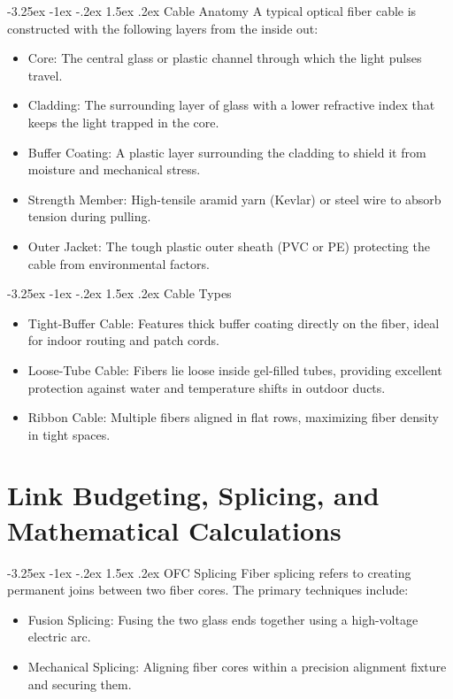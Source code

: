 \documentclass[11pt,a4paper]{report}
\makeatletter
\renewcommand{\section}{\@startsection{section}{1}{\z@}%
  {-3.25ex \@plus -1ex \@minus -.2ex}%
  {1.5ex \@plus.2ex}%
  {\normalfont\Large\bfseries\color{primaryColor}}}
\makeatother
\begin{document}
\section{Cable Anatomy}
A typical optical fiber cable is constructed with the following layers from the inside out:
\begin{itemize}
  \item Core: The central glass or plastic channel through which the light pulses travel.
  \item Cladding: The surrounding layer of glass with a lower refractive index that keeps the light trapped in the core.
  \item Buffer Coating: A plastic layer surrounding the cladding to shield it from moisture and mechanical stress.
  \item Strength Member: High-tensile aramid yarn (Kevlar) or steel wire to absorb tension during pulling.
  \item Outer Jacket: The tough plastic outer sheath (PVC or PE) protecting the cable from environmental factors.
\end{itemize}
\section{Cable Types}
\begin{itemize}
  \item Tight-Buffer Cable: Features thick buffer coating directly on the fiber, ideal for indoor routing and patch cords.
  \item Loose-Tube Cable: Fibers lie loose inside gel-filled tubes, providing excellent protection against water and temperature shifts in outdoor ducts.
  \item Ribbon Cable: Multiple fibers aligned in flat rows, maximizing fiber density in tight spaces.
\end{itemize}
\chapter{Link Budgeting, Splicing, and Mathematical Calculations}
\section{OFC Splicing}
Fiber splicing refers to creating permanent joins between two fiber cores. The primary techniques include:
\begin{itemize}
  \item Fusion Splicing: Fusing the two glass ends together using a high-voltage electric arc.
  \item Mechanical Splicing: Aligning fiber cores within a precision alignment fixture and securing them.
\end{itemize}
\end{document}
